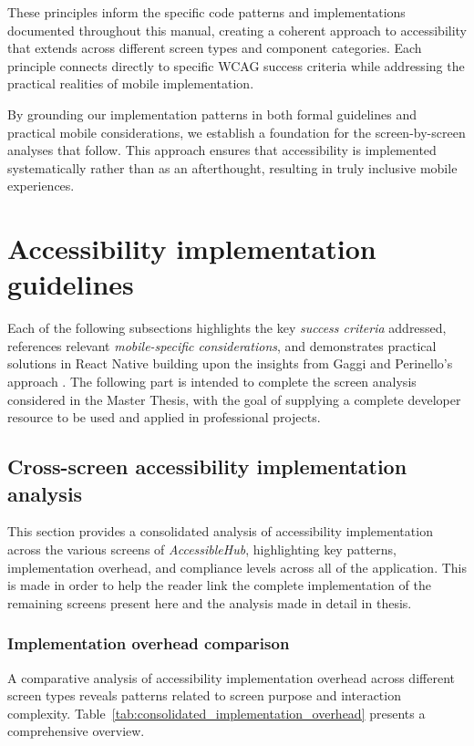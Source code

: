 These principles inform the specific code patterns and implementations documented throughout this manual, creating a coherent approach to accessibility that extends across different screen types and component categories. Each principle connects directly to specific WCAG success criteria while addressing the practical realities of mobile implementation.

By grounding our implementation patterns in both formal guidelines and practical mobile considerations, we establish a foundation for the screen-by-screen analyses that follow. This approach ensures that accessibility is implemented systematically rather than as an afterthought, resulting in truly inclusive mobile experiences.

\section{Accessibility implementation guidelines}
\label{sec:implementation-guidelines}

Each of the following subsections highlights the key \textit{success criteria} addressed, references relevant \textit{mobile-specific considerations}, and demonstrates practical solutions in React Native building upon the insights from Gaggi and Perinello's approach \cite{budai2024mobile}. The following part is intended to complete the screen analysis considered in the Master Thesis, with the goal of supplying a complete developer resource to be used and applied in professional projects.

\subsection{Cross-screen accessibility implementation analysis}
\label{subsec:cross-screen-analysis}

This section provides a consolidated analysis of accessibility implementation across the various screens of \textit{AccessibleHub}, highlighting key patterns, implementation overhead, and compliance levels across all of the application. This is made in order to help the reader link the complete implementation of the remaining screens present here and the analysis made in detail in thesis.

\subsubsection{Implementation overhead comparison}

A comparative analysis of accessibility implementation overhead across different screen types reveals patterns related to screen purpose and interaction complexity. Table~\ref{tab:consolidated_implementation_overhead} presents a comprehensive overview.

